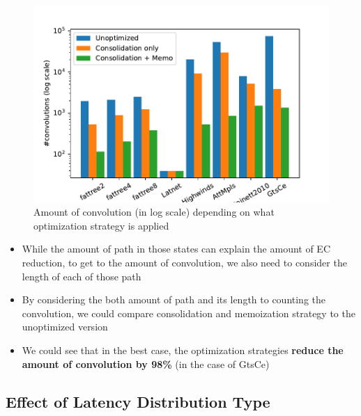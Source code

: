 \documentclass[10pt,sigconf,letterpaper,anonymous,nonacm]{acmart}
\begin{document}
\begin{figure}[h]
    \centering
    \includegraphics[scale=0.5]{optimization}
    \caption{Amount of convolution (in log scale) depending on what optimization strategy is applied}
    \label{fig:opt}
\end{figure}

\begin{itemize}
    \item While the amount of path in those states can explain the amount of EC reduction, to get to 
        the amount of convolution, we also need to consider the length of each of those path
    \item By considering the both amount of path and its length to counting the convolution, we could 
        compare consolidation and memoization strategy to the unoptimized version
    \item We could see that in the best case, the optimization strategies \textbf{reduce the amount of 
        convolution by 98\%} (in the case of GtsCe)
\end{itemize}

\subsection{Effect of Latency Distribution Type}
\end{document}
